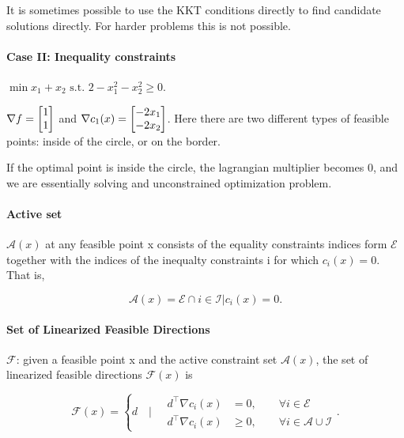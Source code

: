 \documentclass{article}
\begin{document}
It is sometimes possible to use the KKT conditions directly to find candidate solutions directly. For harder problems this is not possible.

\paragraph{Case II: Inequality constraints} $\min  x_1+ x_2 \text{ s.t. } 2-x_1^2 -x_2^2 \geq 0$.

\begin{minipage}[c]{0.5\textwidth}
\end{minipage}
\begin{minipage}[c]{0.5\textwidth}
  $\nabla f = \begin{bmatrix} 1 \\ 1 \end{bmatrix}$ and $\nabla c_1(x) = \begin{bmatrix} -2x_1 \\ -2x_2 \end{bmatrix}$. 
  Here there are two different types of feasible points: inside of the circle, or on the border.
  
  If the optimal point is inside the circle, the lagrangian multiplier becomes 0, and we are essentially solving 
  and unconstrained optimization problem. 
\end{minipage}

\paragraph{Active set} $\mathcal{A}(x)$ at any feasible point x consists of the 
equality constraints indices form $\mathcal{E}$ together with the indices of the inequalty constraints
i for which $c_i(x) = 0$. That is,

\[
  \mathcal{A}(x) = \mathcal{E}\cap{i\in \mathcal{I} | c_i(x) = 0}
.\] 


\paragraph{Set of Linearized Feasible Directions} $\mathcal{F}$: given a feasible point x and the
active constraint set $\mathcal{A}(x)$, the set of linearized feasible directions $\mathcal{F}(x)$ is

\[
  \mathcal{F}(x) = \left\{
    d \quad | \quad \begin{aligned}
      d^{\top}\nabla c_i(x) &= 0, \qquad \forall i\in\mathcal{E} \\
      d^{\top}\nabla c_i(x) &\geq 0, \qquad \forall i\in \mathcal{A}\cup\mathcal{I} 
    \end{aligned}
  \right.
.\] 
\end{document}
